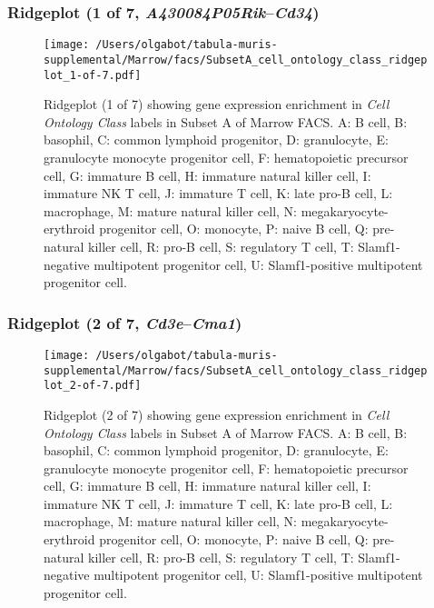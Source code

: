 \clearpage

\subsubsection{Ridgeplot (1 of 7, \emph{A430084P05Rik}--\emph{Cd34})}
\begin{figure}[h]
\centering
\texttt{[image: /Users/olgabot/tabula-muris-supplemental/Marrow/facs/SubsetA\_cell\_ontology\_class\_ridgeplot\_1-of-7.pdf]}

\caption{ Ridgeplot (1 of 7)  showing gene expression enrichment in \emph{Cell Ontology Class} labels in Subset A of Marrow FACS. A: B cell, B: basophil, C: common lymphoid progenitor, D: granulocyte, E: granulocyte monocyte progenitor cell, F: hematopoietic precursor cell, G: immature B cell, H: immature natural killer cell, I: immature NK T cell, J: immature T cell, K: late pro-B cell, L: macrophage, M: mature natural killer cell, N: megakaryocyte-erythroid progenitor cell, O: monocyte, P: naive B cell, Q: pre-natural killer cell, R: pro-B cell, S: regulatory T cell, T: Slamf1-negative multipotent progenitor cell, U: Slamf1-positive multipotent progenitor cell.}
\end{figure}


\clearpage

\subsubsection{Ridgeplot (2 of 7, \emph{Cd3e}--\emph{Cma1})}
\begin{figure}[h]
\centering
\texttt{[image: /Users/olgabot/tabula-muris-supplemental/Marrow/facs/SubsetA\_cell\_ontology\_class\_ridgeplot\_2-of-7.pdf]}

\caption{ Ridgeplot (2 of 7)  showing gene expression enrichment in \emph{Cell Ontology Class} labels in Subset A of Marrow FACS. A: B cell, B: basophil, C: common lymphoid progenitor, D: granulocyte, E: granulocyte monocyte progenitor cell, F: hematopoietic precursor cell, G: immature B cell, H: immature natural killer cell, I: immature NK T cell, J: immature T cell, K: late pro-B cell, L: macrophage, M: mature natural killer cell, N: megakaryocyte-erythroid progenitor cell, O: monocyte, P: naive B cell, Q: pre-natural killer cell, R: pro-B cell, S: regulatory T cell, T: Slamf1-negative multipotent progenitor cell, U: Slamf1-positive multipotent progenitor cell.}
\end{figure}


\clearpage

